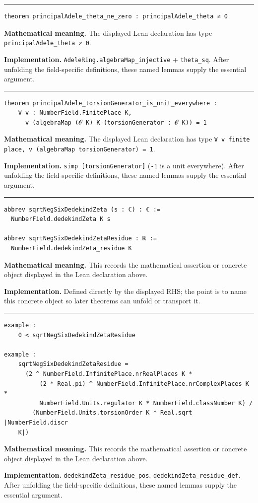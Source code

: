 \documentclass[UTF8,a4paper,11pt,fontset=fandol]{ctexart}
\theoremstyle{definition}
\newcommand{\statementsep}{\par\medskip\hrule\medskip}
\begin{document}
\statementsep
\begin{verbatim}
theorem principalAdele_theta_ne_zero : principalAdele_theta ≠ 0
\end{verbatim}
\noindent\textbf{Mathematical meaning.} The displayed Lean declaration has type \texttt{principalAdele\_\allowbreak{}theta ≠ 0}.\par
\noindent\textbf{Implementation.} \texttt{AdeleRing.\allowbreak{}algebraMap\_\allowbreak{}injective} + \texttt{theta\_\allowbreak{}sq}. After unfolding the field-specific definitions, these named lemmas supply the essential argument.\par
\statementsep
\begin{verbatim}
theorem principalAdele_torsionGenerator_is_unit_everywhere :
    ∀ v : NumberField.FinitePlace K,
      v (algebraMap (𝓞 K) K (torsionGenerator : 𝓞 K)) = 1
\end{verbatim}
\noindent\textbf{Mathematical meaning.} The displayed Lean declaration has type \texttt{∀ v finite place, v (algebraMap torsionGenerator) = 1}.\par
\noindent\textbf{Implementation.} \texttt{simp [torsionGenerator]} (\texttt{-1} is a unit everywhere). After unfolding the field-specific definitions, these named lemmas supply the essential argument.\par
\statementsep
\begin{verbatim}
abbrev sqrtNegSixDedekindZeta (s : ℂ) : ℂ :=
  NumberField.dedekindZeta K s

abbrev sqrtNegSixDedekindZetaResidue : ℝ :=
  NumberField.dedekindZeta_residue K
\end{verbatim}
\noindent\textbf{Mathematical meaning.} This records the mathematical assertion or concrete object displayed in the Lean declaration above.\par
\noindent\textbf{Implementation.} Defined directly by the displayed RHS; the point is to name this concrete object so later theorems can unfold or transport it.\par
\statementsep
\begin{verbatim}
example :
    0 < sqrtNegSixDedekindZetaResidue

example :
    sqrtNegSixDedekindZetaResidue =
      (2 ^ NumberField.InfinitePlace.nrRealPlaces K *
          (2 * Real.pi) ^ NumberField.InfinitePlace.nrComplexPlaces K *
          NumberField.Units.regulator K * NumberField.classNumber K) /
        (NumberField.Units.torsionOrder K * Real.sqrt |NumberField.discr
    K|)
\end{verbatim}
\noindent\textbf{Mathematical meaning.} This records the mathematical assertion or concrete object displayed in the Lean declaration above.\par
\noindent\textbf{Implementation.} \texttt{dedekindZeta\_\allowbreak{}residue\_\allowbreak{}pos}, \texttt{dedekindZeta\_\allowbreak{}residue\_\allowbreak{}def}. After unfolding the field-specific definitions, these named lemmas supply the essential argument.\par
\end{document}
